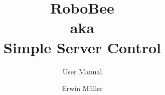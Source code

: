 \newcommand{\AppName}{RoboBee}
\newcommand{\TheEmail}{\url{erwin.mueller@deventm.org}}
\newcommand{\TheCurrentRevisionDate}{\TheRevisionOneDate}
\newcommand{\TheCurrentRevision}{\TheRevisionOne}
\newcommand{\TheCurrentDate}{\TheCurrentRevisionDate}
\newcommand{\TheAuthor}{Erwin Müller}
\newcommand{\TheLogo}{docu-logo}
%
\title{RoboBee\\aka\\Simple Server Control}
\subtitle{User Manual}
\author{\TheAuthor}
\date{\TheCurrentRevision\\\TheCurrentDate}

\lowertitleback{%
\textcopyright{} 2016 \TheAuthor,\\\TheEmail{}\\All rights reserved\\
Logo Death Bee - Big by piewedge \textcopyright{} 2009-2016 piewedge,\\\url{http://piewedge.deviantart.com/art/Death-Bee-Big-129536022 }\\All rights reserved}

\newcommand{\TheRevisionOne}{Revision 1}
\newcommand{\TheRevisionOneDate}{}
%
\uppertitleback{
\TheRevisionOne{} \TheRevisionOneDate\\
}
